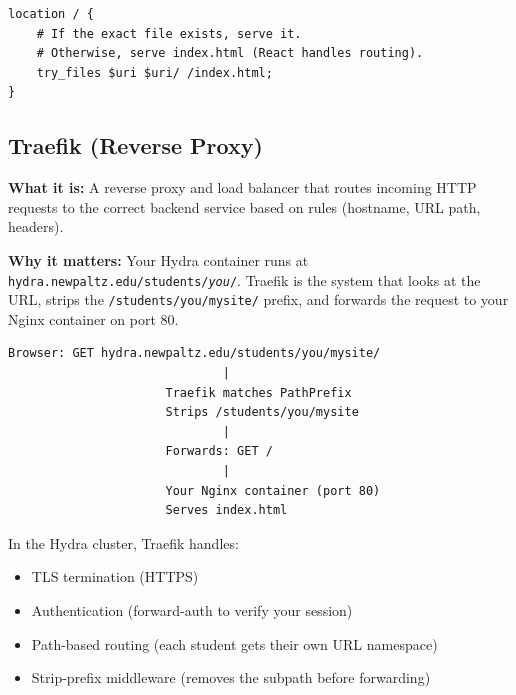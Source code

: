 \documentclass[11pt, letterpaper]{article}
\begin{document}
\begin{lstlisting}[style=code, caption={nginx.conf --- SPA routing (the critical part)}]
location / {
    # If the exact file exists, serve it.
    # Otherwise, serve index.html (React handles routing).
    try_files $uri $uri/ /index.html;
}
\end{lstlisting}

\subsection{Traefik (Reverse Proxy)}

\textbf{What it is:} A reverse proxy and load balancer that routes incoming
HTTP requests to the correct backend service based on rules (hostname, URL
path, headers).

\textbf{Why it matters:} Your Hydra container runs at
\texttt{hydra.newpaltz.edu/students/\textit{you}/}. Traefik is the system that
looks at the URL, strips the \texttt{/students/you/mysite/} prefix, and
forwards the request to your Nginx container on port 80.

\begin{center}
\begin{tcolorbox}[
  colback=codeGray,
  colframe=codeBorder,
  width=0.95\textwidth,
  arc=2pt,
]
\begin{verbatim}
Browser: GET hydra.newpaltz.edu/students/you/mysite/
                              |
                      Traefik matches PathPrefix
                      Strips /students/you/mysite
                              |
                      Forwards: GET /
                              |
                      Your Nginx container (port 80)
                      Serves index.html
\end{verbatim}
\end{tcolorbox}
\end{center}

In the Hydra cluster, Traefik handles:
\begin{itemize}[nosep]
  \item TLS termination (HTTPS)
  \item Authentication (forward-auth to verify your session)
  \item Path-based routing (each student gets their own URL namespace)
  \item Strip-prefix middleware (removes the subpath before forwarding)
\end{itemize}
\end{document}
